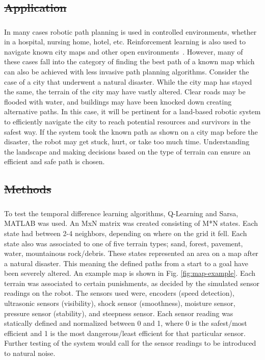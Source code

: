 \documentclass[12pt,american]{report}
\providecommand{\DIFaddtex}[1]{{\protect\color{blue}\uwave{#1}}} %
\providecommand{\DIFdeltex}[1]{{\protect\color{red}\sout{#1}}}                      %
\providecommand{\DIFaddbegin}{} %
\providecommand{\DIFaddend}{} %
\providecommand{\DIFdelbegin}{} %
\providecommand{\DIFdelend}{} %
\providecommand{\DIFadd}[1]{\texorpdfstring{\DIFaddtex{#1}}{#1}} %
\providecommand{\DIFdel}[1]{\texorpdfstring{\DIFdeltex{#1}}{}} %
\newcommand{\DIFscaledelfig}{0.5}
\newlength{\DIFdelgraphicswidth} %
\newlength{\DIFdelgraphicsheight} %
\newcommand{\DIFaddincludegraphics}[2][]{{\color{blue}\fbox{\DIFOincludegraphics[#1]{#2}}}} %
\newcommand{\DIFdelincludegraphics}[2][]{%
\sbox{\DIFdelgraphicsbox}{\DIFOincludegraphics[#1]{#2}}%
\settoboxwidth{\DIFdelgraphicswidth}{\DIFdelgraphicsbox} %
\settoboxtotalheight{\DIFdelgraphicsheight}{\DIFdelgraphicsbox} %
\scalebox{\DIFscaledelfig}{%
\parbox[b]{\DIFdelgraphicswidth}{\usebox{\DIFdelgraphicsbox}\\[-\baselineskip] \rule{\DIFdelgraphicswidth}{0em}}\llap{\resizebox{\DIFdelgraphicswidth}{\DIFdelgraphicsheight}{%
\setlength{\unitlength}{\DIFdelgraphicswidth}%
\begin{picture}(1,1)%
\thicklines\linethickness{2pt} %
{\color[rgb]{1,0,0}\put(0,0){\framebox(1,1){}}}%
{\color[rgb]{1,0,0}\put(0,0){\line( 1,1){1}}}%
{\color[rgb]{1,0,0}\put(0,1){\line(1,-1){1}}}%
\end{picture}%
}\hspace*{3pt}}} %
} %
\DeclareRobustCommand{\DIFaddbegin}{\DIFOaddbegin \let\includegraphics\DIFaddincludegraphics} %
\DeclareRobustCommand{\DIFaddend}{\DIFOaddend \let\includegraphics\DIFOincludegraphics} %
\DeclareRobustCommand{\DIFdelbegin}{\DIFOdelbegin \let\includegraphics\DIFdelincludegraphics} %
\DeclareRobustCommand{\DIFdelend}{\DIFOaddend \let\includegraphics\DIFOincludegraphics} %
\begin{document}
\DIFdelbegin \subsection{\DIFdel{Application}}
\addtocounter{subsection}{-1}%
\DIFdelend \DIFaddbegin \subsubsection{\DIFadd{Application}}
\DIFaddend In many cases robotic path planning is used in controlled environments, whether in a hospital, nursing home, hotel, etc. Reinforcement learning is also used to navigate known city maps and other open environments~\cite{peng2015mobile}. However, many of these cases fall into the category of finding the best path of a known map which can also be achieved with less invasive path planning algorithms. Consider the case of a city that underwent a natural disaster.  While the city map has stayed the same, the terrain of the city may have vastly altered. Clear roads may be flooded with water, and buildings may have been knocked down creating alternative paths. In this case, it will be pertinent for a land-based robotic system to efficiently navigate the city to reach potential resources and survivors in the safest way.  If the system took the known path as shown on a city map before the disaster, the robot may get stuck, hurt, or take too much time.  Understanding the landscape and making decisions based on the type of terrain can ensure an efficient and safe path is chosen.

\DIFdelbegin \subsection{\DIFdel{Methods}}
\addtocounter{subsection}{-1}%
\DIFdelend \DIFaddbegin \subsubsection{\DIFadd{Methods}}
\DIFaddend 

To test the temporal difference learning algorithms, Q-Learning and Sarsa, MATLAB was used. An MxN matrix was created consisting of M*N states.  Each state had between 2-4 neighbors, depending on where on the grid it fell.  Each state also was associated to one of five terrain types; sand, forest, pavement, water, mountainous rock/debris.  These states represented an area on a map after a natural disaster.  This meaning the defined paths from a start to a goal have been severely altered. An example map is shown in Fig. \ref{fig:map-example}. Each terrain was associated to certain punishments, as decided by the simulated sensor readings on the robot.  The sensors used were, encoders (speed detection), ultrasonic sensors (visibility), shock sensor (smoothness), moisture sensor, pressure sensor (stability), and steepness sensor.  Each sensor reading was statically defined and normalized between 0 and 1, where 0 is the safest/most efficient and 1 is the most dangerous/least efficient for that particular sensor. Further testing of the system would call for the sensor readings to be introduced to natural noise.
\end{document}
